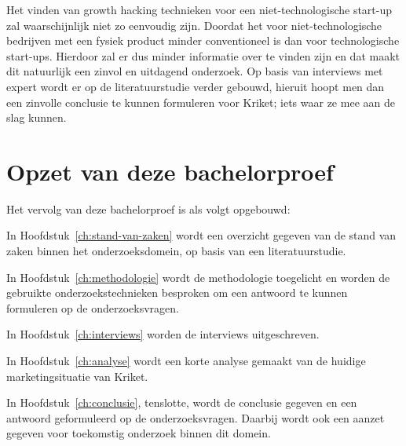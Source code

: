 Het vinden van growth hacking technieken voor een niet-technologische start-up zal waarschijnlijk niet zo eenvoudig zijn. Doordat het voor niet-technologische bedrijven met een fysiek product minder conventioneel is dan voor technologische start-ups. Hierdoor zal er dus minder informatie over te vinden zijn en dat maakt dit natuurlijk een zinvol en uitdagend onderzoek. Op basis van interviews met expert wordt er op de literatuurstudie verder gebouwd, hieruit hoopt men dan een zinvolle conclusie te kunnen formuleren voor Kriket; iets waar ze mee aan de slag kunnen.

\section{Opzet van deze bachelorproef}
\label{sec:opzet-bachelorproef}


Het vervolg van deze bachelorproef is als volgt opgebouwd:

In Hoofdstuk~\ref{ch:stand-van-zaken} wordt een overzicht gegeven van de stand van zaken binnen het onderzoeksdomein, op basis van een literatuurstudie.

In Hoofdstuk~\ref{ch:methodologie} wordt de methodologie toegelicht en worden de gebruikte onderzoekstechnieken besproken om een antwoord te kunnen formuleren op de onderzoeksvragen.

In Hoofdstuk~\ref{ch:interviews} worden de interviews uitgeschreven.

In Hoofdstuk~\ref{ch:analyse} wordt een korte analyse gemaakt van de huidige marketingsituatie van Kriket.

In Hoofdstuk~\ref{ch:conclusie}, tenslotte, wordt de conclusie gegeven en een antwoord geformuleerd op de onderzoeksvragen. Daarbij wordt ook een aanzet gegeven voor toekomstig onderzoek binnen dit domein.


